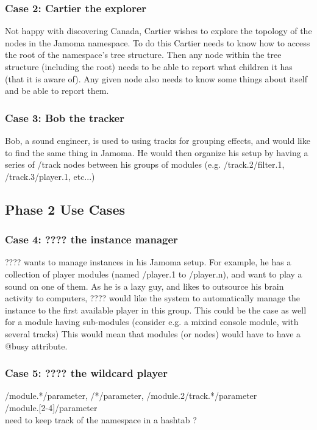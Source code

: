 \documentclass[]{article}
\begin{document}
\subsubsection{Case 2: Cartier the explorer}

Not happy with discovering Canada, Cartier wishes to explore the topology of the nodes in the Jamoma namespace.  To do this Cartier needs to know how to access the root of the namespace's tree structure.  Then any node within the tree structure (including the root) needs to be able to report what children it has (that it is aware of).  Any given node also needs to know some things about itself and be able to report them.

\subsubsection{Case 3: Bob the tracker}
Bob, a sound engineer, is used to using tracks for grouping effects, and would like to find the same thing in Jamoma. He would then organize his setup by having a series of /track nodes between his groups of modules (e.g. /track.2/filter.1, /track.3/player.1, etc...)


\subsection{Phase 2 Use Cases}

\subsubsection{Case 4: ???? the instance manager}
???? wants to manage instances in his Jamoma setup. For example, he has a collection of player modules (named /player.1 to /player.n), and want to play a sound on one of them. As he is a lazy guy, and likes to outsource his brain activity to computers, ???? would like the system to automatically manage the instance to the first available player in this group. This could be the case as well for a module having sub-modules (consider e.g. a mixind console module, with several tracks) This would mean that modules (or nodes) would have to have a @busy attribute. 

\subsubsection{Case 5: ???? the wildcard player}
/module.*/parameter, /*/parameter, /module.2/track.*/parameter\\
/module.[2-4]/parameter\\
need to keep track of the namespace in a hashtab ?
\end{document}
